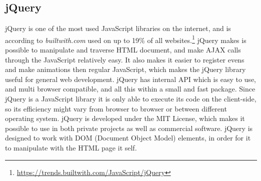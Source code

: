 \subsection{jQuery} \label{ssec:jquery}
jQuery is one of the most used JavaScript libraries on the internet, and is according to \textit{builtwith.com} used on up to 19\% of all websites.\footnote{\url{https://trends.builtwith.com/JavaScript/jQuery}}
jQuery makes is possible to manipulate and traverse HTML document, and make AJAX calls through the JavaScript relatively easy.
It also makes it easier to register evens and make animations then regular JavaScript, which makes the jQuery library useful for general web development.
jQuery has internal API which is easy to use, and multi browser compatible, and all this within a small and fast package.
Since jQuery is a JavaScript library it is only able to execute its code on the client-side, so its efficiency might vary from browser to browser or between different operating system.
jQuery is developed under the MIT License, which makes it possible to use in both private projects as well as commercial software.
jQuery is designed to work with DOM (Document Object Model) elements, in order for it to manipulate with the HTML page it self.
